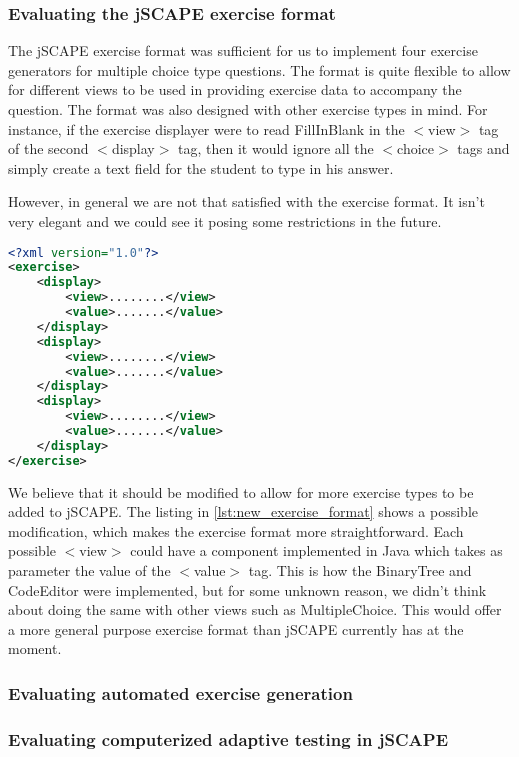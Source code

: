 \subsubsection{Evaluating the jSCAPE exercise format}
The jSCAPE exercise format was sufficient for us to implement four exercise generators for multiple choice type questions. The format is quite flexible to allow for different views to be used in providing exercise data to accompany the question. The format was also designed with other exercise types in mind. For instance, if the exercise displayer were to read \textsf{FillInBlank} in the \textsf{$<$view$>$} tag of the second \textsf{$<$display$>$} tag, then it would ignore all the \textsf{$<$choice$>$} tags and simply create a text field for the student to type in his answer. \newline

However, in general we are not that satisfied with the exercise format. It isn't very elegant and we could see it posing some restrictions in the future. \newline

\begin{lstlisting}[language=xml, caption={A modified exercise format.}, label=lst:new_exercise_format]
<?xml version="1.0"?>
<exercise>
	<display>
		<view>........</view>
		<value>.......</value>
	</display>
	<display>
		<view>........</view>
		<value>.......</value>
	</display>
	<display>
		<view>........</view>
		<value>.......</value>
	</display>
</exercise>
\end{lstlisting}

We believe that it should be modified to allow for more exercise types to be added to jSCAPE. The listing in \ref{lst:new_exercise_format} shows a possible modification, which makes the exercise format more straightforward. Each possible \textsf{$<$view$>$} could have a component implemented in Java which takes as parameter the value of the \textsf{$<$value$>$} tag. This is how the \textsf{BinaryTree} and \textsf{CodeEditor} were implemented, but for some unknown reason, we didn't think about doing the same with other views such as \textsf{MultipleChoice}. This would offer a more general purpose exercise format than jSCAPE currently has at the moment.

\subsubsection{Evaluating automated exercise generation}


\subsubsection{Evaluating computerized adaptive testing in jSCAPE}



